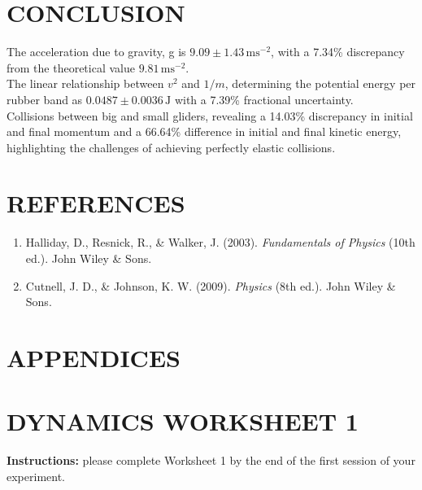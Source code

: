 \documentclass[a4paper,11pt]{article}
\begin{document}
\newpage
{}
\section*{\center  CONCLUSION}
\label{sec:CONCLUSION}
\quad The acceleration due to gravity, g is \(9.09 \pm 1.43 \, \text{ms}^{-2}\), with a 7.34\% discrepancy from the theoretical value \(9.81 \, \text{ms}^{-2}\). \\

The linear relationship between \(v^2\) and \(1/m\), determining the potential energy per rubber band as \(0.0487 \pm 0.0036 \, \text{J}\) with a 7.39\% fractional uncertainty. \\

Collisions between big and small gliders, revealing a 14.03\% discrepancy in initial and final momentum and a 66.64\% difference in initial and final kinetic energy, highlighting the challenges of achieving perfectly elastic collisions. 

\newpage
{}
\section*{\center REFERENCES}
\label{sec:REFERENCES}
\begin{enumerate}
    \item Halliday, D., Resnick, R., \& Walker, J. (2003). \textit{Fundamentals of Physics} (10th ed.). John Wiley \& Sons.
    \item Cutnell, J. D., \& Johnson, K. W. (2009). \textit{Physics} (8th ed.). John Wiley \& Sons.
\end{enumerate}


\newpage
{}
\section*{\center APPENDICES}
\label{sec:APPENDICES}

\section*{DYNAMICS WORKSHEET 1}

\textbf{Instructions:} please complete Worksheet 1 by the end of the first session of your experiment.
\end{document}
